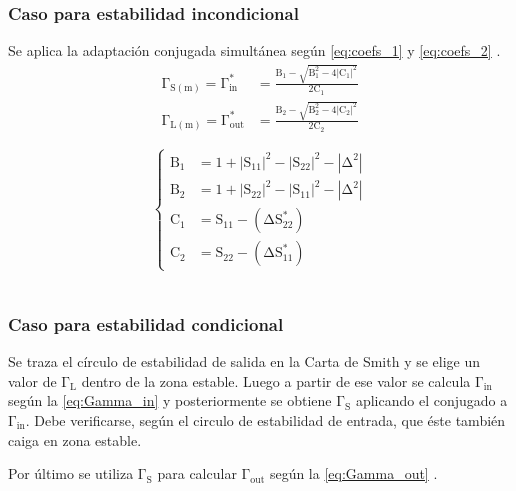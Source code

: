 \documentclass{article}
\begin{document}
\subsubsection{Caso para estabilidad incondicional} \label{section:sec_2.7.1}
Se aplica la adaptación conjugada simultánea según \autoref{eq:coefs_1} y \autoref{eq:coefs_2} \cite[p.~572]{pozar_microwave}.
\begin{equation}
    \begin{aligned}
        \mathrm{\Gamma_{S(m)} = \Gamma_{in}^{*}}  & \mathrm{= \frac{B_{1} - \sqrt{B_{1}^{2} - 4|C_{1}|^{2}}}{2C_{1}}}  \\
        \mathrm{\Gamma_{L(m)} = \Gamma_{out}^{*}} & \mathrm{= \frac{B_{2} - \sqrt{B_{2}^{2} - 4|C_{2}|^{2}}}{2C_{2}}}
    \end{aligned}
    \label{eq:coefs_1}
\end{equation}

\begin{equation}
    \begin{cases}
        \mathrm{B_{1}} & \mathrm{= 1 + |S_{11}|^{2} - |S_{22}|^{2} - |\Delta^{2}|} \\
        \mathrm{B_{2}} & \mathrm{= 1 + |S_{22}|^{2} - |S_{11}|^{2} - |\Delta^{2}|} \\
        \mathrm{C_{1}} & \mathrm{= S_{11} - (\Delta S_{22}^{*})} \\
        \mathrm{C_{2}} & \mathrm{= S_{22} - (\Delta S_{11}^{*})}
    \end{cases}
    \label{eq:coefs_2}
\end{equation}
\\

\subsubsection{Caso para estabilidad condicional} \label{section:sec_2.7.2}
Se traza el círculo de estabilidad de salida en la Carta de Smith y se elige un valor de $\mathrm{\Gamma_L}$ dentro de la zona estable. Luego a partir de ese valor se calcula $\mathrm{\Gamma_{in}}$ según la \autoref{eq:Gamma_in} y posteriormente se obtiene $\mathrm{\Gamma_S}$ aplicando el conjugado a $\mathrm{\Gamma_{in}}$. Debe verificarse, según el circulo de estabilidad de entrada, que éste también caiga en zona estable.

Por último se utiliza $\mathrm{\Gamma_S}$ para calcular $\mathrm{\Gamma_{out}}$ según la \autoref{eq:Gamma_out} \cite[p.~252]{gonzalez_amplifiers}.
\\
\end{document}
